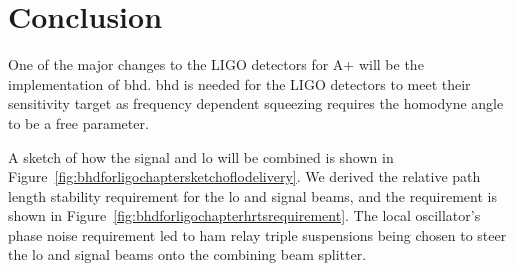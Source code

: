 \section{Conclusion}
\label{sec:BHD_for_ligo_conclusion_1}
One of the major changes to the LIGO detectors for A+ will be the implementation of \gls{bhd}. \gls{bhd} is needed for the LIGO detectors to meet their sensitivity target as frequency dependent squeezing requires the homodyne angle to be a free parameter. 
\par
A sketch of how the signal and \gls{lo} will be combined is shown in Figure~\ref{fig:bhdforligochaptersketchoflodelivery}. We derived the relative path length stability requirement for the \gls{lo} and signal beams, and the requirement is shown in Figure~\ref{fig:bhdforligochapterhrtsrequirement}. The local oscillator's phase noise requirement led to \gls{ham} relay triple suspensions being chosen to steer the \gls{lo} and signal beams onto the combining beam splitter. 
